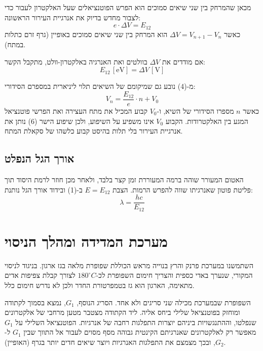 \documentclass[14pt]{extarticle}
\begin{document}
מכאן שהמרחק בין שני שיאים סמוכים הוא הפרש הפוטנציאלים שעל האלקטרון לעבור כדי לצבור מחדש
בדיוק את אנרגיית העירור הראשונה:
\begin{equation}
    e \cdot \Delta V = E_{12}
\end{equation}
כאשר $\Delta V = V_{n+1} - V_n$  הוא המרחק בין שני שיאים סמוכים באופיין (גרף זרם כתלות במתח).

אם מודדים את $\Delta V$ בוולטים ואת האנרגיה באלקטרון-וולט, מתקבל הקשר:
\begin{equation}
    E_{12}\,[\mathrm{eV}] = \Delta V\,[\mathrm{V}]
\end{equation}

מ-(4) נובע גם שמיקומם של השיאים תלוי ליניארית במספרם הסידורי:
\begin{equation}
    V_n = \frac{E_{12}}{e} \cdot n + V_0
\end{equation}
כאשר $n$ מספרו הסידורי של השיא, ו-$V_0$ קבוע המכיל את מתח העצירה ואת הפרשי פוטנציאל המגע
בין האלקטרודות. הקבוע $V_0$ אינו משפיע על השיפוע, ולכן שיפוע הישר (6) נותן את אנרגיית העירור
בלי תלות בהיסט קבוע כלשהו של סקאלת המתח.

\subsection*{אורך הגל הנפלט}

האטום המעורר שוהה ברמה המעוררת זמן קצר בלבד, ולאחר מכן חוזר לרמת היסוד תוך פליטת פוטון
שאנרגיתו שווה להפרש הרמות. הצבת $E = E_{12}$ ב-(1) ובידוד אורך הגל נותנת:
\begin{equation}
    \lambda = \frac{hc}{E_{12}}
\end{equation}

\section*{מערכת המדידה ומהלך הניסוי}

השתמשנו במערכת פרנק והרץ בנוייה מראש הכוללת שפופרת מלאה בגז ארגון. בניגוד לניסוי המקורי,
שנערך באדי כספית והצריך חימום השפופרת לכ-$180^\circ C$ לצורך קבלת צפיפות אדים מתאימה,
הארגון הוא גז בטמפרטורת החדר ולכן לא נדרש חימום כלל.

השפופרת שבמערכת מכילה שני סריגים ולא אחד. הסריג הנוסף, $G_1$, נמצא בסמוך לקתודה ומוחזק
בפוטנציאל שלילי ביחס אליה. ליד הקתודה מצטבר מטען מרחבי של אלקטרונים שנפלטו, וההתנגשויות
ביניהם יוצרות התפלגות רחבה של אנרגיות. הפוטנציאל השלילי על $G_1$ מאפשר רק לאלקטרונים
שאנרגיתם הקינטית גבוהה מסף מסוים לעבור אל התווך שבין $G_1$ ל-$G_2$, ובכך מצמצם את התפלגות
האנרגיות ויוצר שיאים חדים יותר בגרף (האופיין).
\end{document}
